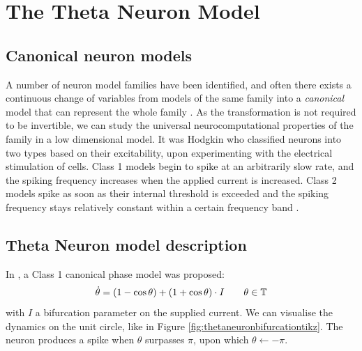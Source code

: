 \newpage
\section{The Theta Neuron Model} \label{TheThetaNeuronModel}
\subsection{Canonical neuron models}
A number of neuron model families have been identified, and often there exists a continuous change of variables from models of the same family into a \textit{canonical} model that can represent the whole family \cite{Hoppensteadt2001CanonicalNM}. As the transformation is not required to be invertible, we can study the universal neurocomputational properties of the family in a low dimensional model.
It was Hodgkin \cite{Hodgkin1948} who classified neurons into two types based on their excitability, upon experimenting with the electrical stimulation of cells. Class 1 models begin to spike at an arbitrarily slow rate, and the spiking frequency increases when the applied current is increased. Class 2 models spike as soon as their internal threshold is exceeded and the spiking frequency stays relatively constant within a certain frequency band \cite{Hoppensteadt2001CanonicalNM}.


\subsection{Theta Neuron model description} \label{sec:TheThetaNeuronModelDescription}
In \cite{Ermentrout1986}, a Class 1 canonical phase model was proposed:
\begin{align}
\dot{\theta} = (1-\cos \theta)+(1+\cos \theta) \cdot I \qquad \theta \in {\mathbb{T}} \label{eq:thetaneuron}
\end{align}
with $I$ a bifurcation parameter on the supplied current. We can visualise the dynamics on the unit circle, like in Figure \ref{fig:thetaneuronbifurcationtikz}. The neuron produces a spike when $\theta$ surpasses $\pi$, upon which $\theta \leftarrow -\pi$. 

